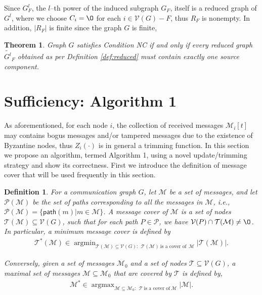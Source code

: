 \documentclass[letterpaper, 11pt]{article}
\DeclareMathOperator*{\argmin}{argmin}
\DeclareMathOperator*{\argmax}{argmax}
\newtheorem{definition}{Definition}[section]
\newtheorem{theorem}{Theorem}[section]
\newcommand{\calM}{{\mathcal{M}}}
\newcommand{\calP}{{\mathcal{P}}}
\newcommand{\calT}{{\mathcal{T}}}
\newcommand{\calV}{{\mathcal{V}}}
\begin{document}
Since $G_F^l$, the $l$--th power of the induced subgraph $G_F$, itself is a reduced graph of $G^l$, where we choose $C_i=\O$ for each $i\in \calV(G)-F$, thus $R_F$ is nonempty.
 In addition, $|R_F|$ is finite since the graph $G$ is finite,


\begin{theorem}
\label{thm:nc2}
Graph $G$ satisfies Condition NC if and only if every reduced graph $\widetilde{G^l}_F$ obtained as per Definition \ref{def:reduced}
must contain exactly one {\em source component}.
\end{theorem}


\section{Sufficiency: Algorithm 1}
\label{sec:sufficiency}

As aforementioned, for each node $i$, the collection of received messages $\calM_i[t]$ may contains bogus messages and/or tampered messages due to the existence of Byzantine nodes, thus $Z_i(\cdot)$ is in general a trimming function. In this section we propose an algorithm, termed Algorithm 1, using a novel update/trimming strategy and show its correctness. First we introduce the definition of message cover that will be used frequently in this section. 











\begin{definition}

  For a communication graph $G$, let $\calM$ be a set of messages, and let $\calP(\calM)$ be the set of paths corresponding to all the messages in $\calM$, i.e., $\calP(\calM)= \{\mathsf{path}(m)|m\in \calM\}$. A message cover of $\calM$ is a set of nodes $\calT(\calM)\subseteq \calV(G)$, such that for each path $P\in \calP$, we have $\calV(P)\cap \calT(\calM) \not=\O$. In particular, a minimum message cover is defined by
\begin{align*}
\calT^*(\calM)\in \argmin_{\calT(\calM)\subseteq\calV(G):~~ \calT(\calM)~ \text{is a cover of}~~ \calM} |\calT(\calM)|.
\end{align*}

 Conversely, given a set of messages $\calM_0$ and a set of nodes $\calT\subseteq \calV(G)$, a maximal set of messages $\calM\subseteq\calM_0$ that are covered by $\calT$ is defined by,
 \begin{align*}
 \calM^*\in \argmax_{\calM\subseteq\calM_0:~~\calT~\text{is a cover of}~\calM} |\calM|.
 \end{align*}
\end{definition}
\end{document}
